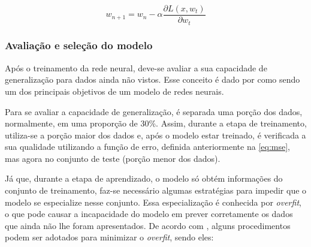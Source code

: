 \documentclass[
    12pt,
    oneside,
    a4paper,
    english,
    brazil
]{abntex2}
\begin{document}
\begin{equation}\label{eq:backpropagation}
    w_{n+1} = w_n - \alpha \frac{\partial L(x,w_t)}{\partial w_t}
\end{equation}

\subsubsection{Avaliação e seleção do modelo}

Após  o treinamento  da rede neural,  deve-se avaliar  a sua capacidade  de
generalização para dados ainda não vistos. Esse conceito é dado por
 como sendo um dos  principais objetivos de um modelo de
redes neurais.

Para se avaliar a capacidade de generalização, é separada uma porção dos dados,
normalmente, em uma  proporção de 30\%. Assim, durante a  etapa de treinamento,
utiliza-se  a  porção maior  dos  dados  e, após  o  modelo  estar treinado,  é
verificada a sua qualidade  utilizando a função de erro,  definida anteriormente
na \autoref{eq:mse}, mas agora no conjunto de teste (porção menor dos dados).

Já  que, durante  a  etapa  de  aprendizado, o  modelo  só  obtém  informações
do  conjunto  de   treinamento,  faz-se  necessário   algumas  estratégias  para
impedir  que  o  modelo  se  especialize nesse  conjunto.  Essa  especialização  é
conhecida por \textit{overfit}, o que pode  causar a incapacidade do  modelo em
prever  corretamente  os  dados  que  ainda não  lhe foram  apresentados. De 
acordo com , alguns procedimentos podem ser adotados para 
minimizar o \textit{overfit}, sendo eles:
\end{document}
